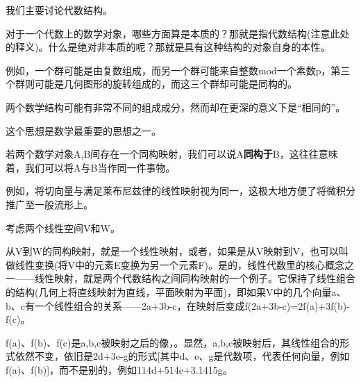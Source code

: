 我们主要讨论代数结构。

对于一个代数上的数学对象，哪些方面算是本质的？那就是指代数结构(注意此处的释义)。什么是绝对非本质的呢？那就是具有这种结构的对象自身的本性。

例如，一个群可能是由复数组成，而另一个群可能来自整数mod一个素数p，第三个群则可能是几何图形的旋转组成的，而这三个群却可能是同构的。

两个数学结构可能有非常不同的组成成分，然而却在更深的意义下是“相同的”。

这个思想是数学最重要的思想之一。

若两个数学对象A,B间存在一个同构映射，我们可以说A\textbf{同构于}B，这往往意味着，我们可以将A与B当作同一件事物。

例如，将切向量与满足莱布尼兹律的线性映射视为同一，这极大地方便了将微积分推广至一般流形上。

考虑两个线性空间V和W。

从V到W的同构映射，就是一个线性映射，或者，如果是从V映射到V，也可以叫做线性变换(将V中的元素E变换为另一个元素F)。是的，线性代数里的核心概念之一——线性映射，就是两个代数结构之间同构映射的一个例子。它保持了线性组合的结构(几何上将直线映射为直线，平面映射为平面)，即如果V中的几个向量a、b、c有一个线性组合的关系——2a+3b-c，在映射后变成f(2a+3b-c)=2f(a)+3f(b)-f(c)。

f(a)、f(b)、f(c)是a,b,c被映射之后的像，。显然，a,b,c被映射后，其线性组合的形式依然不变，依旧是2d+3e-g的形式[其中d、e、g是代数项，代表任何向量，例如f(a)、f(b)]，而不是别的，例如114d+514e+3.1415g。
